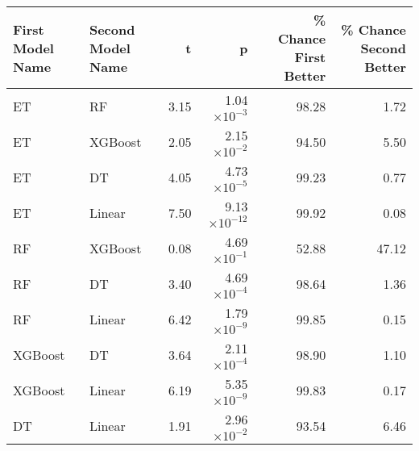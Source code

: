 \begin{tabular}{llrrrr}
\toprule
First Model Name & Second Model Name &    t &            p &  \% Chance First Better &  \% Chance Second Better \\
\midrule
              ET &                RF & 3.15 & 1.04$\times 10^{-3}$ &                  98.28 &                    1.72 \\
              ET &           XGBoost & 2.05 & 2.15$\times 10^{-2}$ &                  94.50 &                    5.50 \\
              ET &                DT & 4.05 & 4.73$\times 10^{-5}$ &                  99.23 &                    0.77 \\
              ET &            Linear & 7.50 & 9.13$\times 10^{-12}$ &                  99.92 &                    0.08 \\
              RF &           XGBoost & 0.08 & 4.69$\times 10^{-1}$ &                  52.88 &                   47.12 \\
              RF &                DT & 3.40 & 4.69$\times 10^{-4}$ &                  98.64 &                    1.36 \\
              RF &            Linear & 6.42 & 1.79$\times 10^{-9}$ &                  99.85 &                    0.15 \\
         XGBoost &                DT & 3.64 & 2.11$\times 10^{-4}$ &                  98.90 &                    1.10 \\
         XGBoost &            Linear & 6.19 & 5.35$\times 10^{-9}$ &                  99.83 &                    0.17 \\
              DT &            Linear & 1.91 & 2.96$\times 10^{-2}$ &                  93.54 &                    6.46 \\
\bottomrule
\end{tabular}
